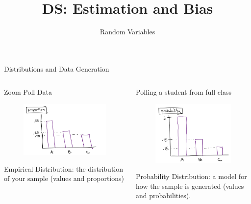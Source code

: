 \documentclass[aspectratio=169]{../latex_main/tntbeamer}  %
\title[Statistics]{DS: Estimation and Bias}
\subtitle{Random Variables}
\begin{document}
	
	\maketitle
	\begin{frame}{Distributions and Data Generation}
	    \begin{columns}
	        \begin{column}{.3\textwidth}
	        Zoom Poll Data\\
	           \begin{figure}
	               \includegraphics[scale=.5]{Bild10}
	           \end{figure}
	           Empirical Distribution: the distribution of your sample (values and proportions)
	        \end{column}
	        
	        \begin{column}{.3\textwidth}
	            Polling a student from full class
                \begin{figure}
                    \includegraphics[scale=.5]{Bild11}
                \end{figure}
                Probability Distribution: a model for how the sample is generated (values and probabilities).
	        \end{column}
	        

\end{columns}
\end{frame}
\end{document}
